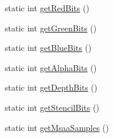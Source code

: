 \textbf{ }\par
\begin{DoxyCompactItemize}
\item 
static int \mbox{\hyperlink{classec_1_1_window_aac6cd3cb2a9d033e41bbd04e84a7be14}{get\+Red\+Bits}} ()
\item 
static int \mbox{\hyperlink{classec_1_1_window_a16e7202f6f304e998772d58a9207bdee}{get\+Green\+Bits}} ()
\item 
static int \mbox{\hyperlink{classec_1_1_window_a28643ab7d940920d1d01052b9c2bd30f}{get\+Blue\+Bits}} ()
\item 
static int \mbox{\hyperlink{classec_1_1_window_ac5bbb3be571ab430ad662b8ca9f7528a}{get\+Alpha\+Bits}} ()
\item 
static int \mbox{\hyperlink{classec_1_1_window_a3a30627927e3a7e113100cf43cae340b}{get\+Depth\+Bits}} ()
\item 
static int \mbox{\hyperlink{classec_1_1_window_aa2c06032e48467991aa9de0861e2c7ea}{get\+Stencil\+Bits}} ()
\item 
static int \mbox{\hyperlink{classec_1_1_window_abb56cab9cdf2d1969e1552be0e2540fe}{get\+Msaa\+Samples}} ()
\end{DoxyCompactItemize}

